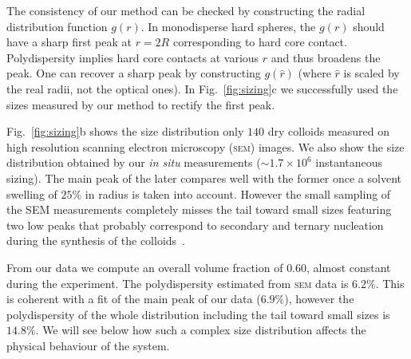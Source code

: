 \documentclass[8.5pt,twoside,twocolumn]{article}
\begin{document}
The consistency of our method can be checked by constructing the radial distribution function $g(r)$. In monodisperse hard spheres, the $g(r)$ should have a sharp first peak at $r=2R$ corresponding to hard core contact. Polydispersity implies hard core contacts at various $r$ and thus broadens the peak. One can recover a sharp peak by constructing $g(\hat{r})$ (where $\hat{r}$ is scaled by the real radii, not the optical ones). In Fig.~\ref{fig:sizing}c we successfully used the sizes measured by our method to rectify the first peak.

Fig.~\ref{fig:sizing}b shows the size distribution only $140$ dry colloids measured on high resolution scanning electron microscopy (\textsc{sem}) images. We also show the size distribution obtained by our \emph{in situ} measurements ($\sim 1.7\times 10^6$ instantaneous sizing). The main peak of the later compares well with the former once a solvent swelling of $25\%$ in radius is taken into account. However the small sampling of the SEM measurements completely misses the tail toward small sizes featuring two low peaks that probably correspond to secondary and ternary nucleation during the synthesis of the colloids~\cite{bosma2002,Poon2012}.

From our data we compute an overall volume fraction of $0.60$, almost constant during the experiment. The polydispersity estimated from \textsc{sem} data is $6.2\%$. This is coherent with a fit of the main peak of our data ($6.9\%$), however the polydispersity of the whole distribution including the tail toward small sizes is $14.8\%$. We will see below how such a complex size distribution affects the physical behaviour of the system.
\end{document}
